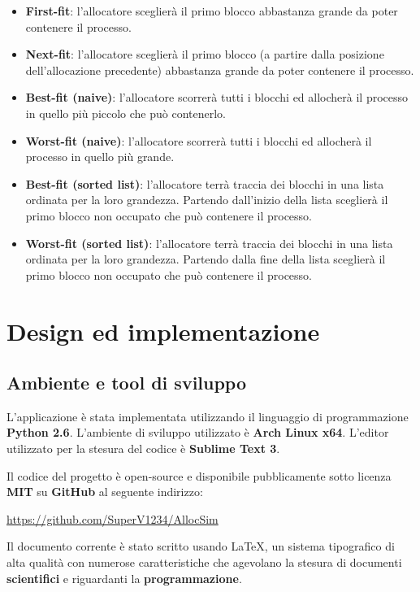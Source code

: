 \documentclass[12pt]{report}
\renewcommand\emph{\textbf}
\begin{document}
        \begin{itemize}
            \item \emph{First-fit}: l'allocatore sceglierà il primo blocco abbastanza grande da poter contenere il processo.
            \item \emph{Next-fit}: l'allocatore sceglierà il primo blocco (a partire dalla posizione dell'allocazione precedente) abbastanza grande da poter contenere il processo.
            \item \emph{Best-fit (naive)}: l'allocatore scorrerà tutti i blocchi ed allocherà il processo in quello più piccolo che può contenerlo.
            \item \emph{Worst-fit (naive)}: l'allocatore scorrerà tutti i blocchi ed allocherà il processo in quello più grande.
            \item \emph{Best-fit (sorted list)}: l'allocatore terrà traccia dei blocchi in una lista ordinata per la loro grandezza. Partendo dall'inizio della lista sceglierà il primo blocco non occupato che può contenere il processo.
            \item \emph{Worst-fit (sorted list)}: l'allocatore terrà traccia dei blocchi in una lista ordinata per la loro grandezza. Partendo dalla fine della lista sceglierà il primo blocco non occupato che può contenere il processo.
        \end{itemize}        

    \section{Design ed implementazione}
        
        \subsection{Ambiente e tool di sviluppo}

            L'applicazione è stata implementata utilizzando il linguaggio di programmazione \emph{Python 2.6}.
            L'ambiente di sviluppo utilizzato è \emph{Arch Linux x64}.
            L'editor utilizzato per la stesura del codice è \emph{Sublime Text 3}.

            Il codice del progetto è open-source e disponibile pubblicamente sotto licenza \emph{MIT} su \emph{GitHub} al seguente indirizzo:

                \url{https://github.com/SuperV1234/AllocSim}

            Il documento corrente è stato scritto usando \LaTeX{}, un sistema tipografico di alta qualità con numerose caratteristiche che agevolano la stesura di documenti \emph{scientifici} e riguardanti la \emph{programmazione}.
\end{document}
